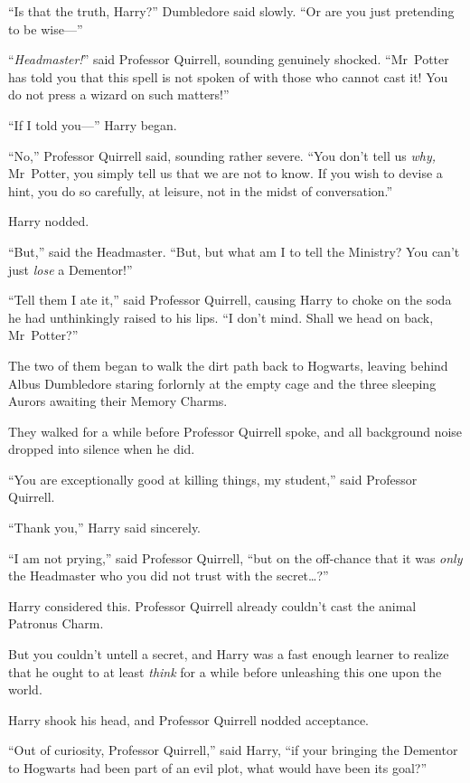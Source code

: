 “Is that the truth, Harry?” Dumbledore said slowly. “Or are you just pretending to be wise—”

“\emph{Headmaster!}” said Professor Quirrell, sounding genuinely shocked. “Mr~Potter has told you that this spell is not spoken of with those who cannot cast it! You do not press a wizard on such matters!”

“If I told you—” Harry began.

“No,” Professor Quirrell said, sounding rather severe. “You don’t tell us \emph{why,} Mr~Potter, you simply tell us that we are not to know. If you wish to devise a hint, you do so carefully, at leisure, not in the midst of conversation.”

Harry nodded.

“But,” said the Headmaster. “But, but what am I to tell the Ministry? You can’t just \emph{lose} a Dementor!”

“Tell them I ate it,” said Professor Quirrell, causing Harry to choke on the soda he had unthinkingly raised to his lips. “I don’t mind. Shall we head on back, Mr~Potter?”

The two of them began to walk the dirt path back to Hogwarts, leaving behind Albus Dumbledore staring forlornly at the empty cage and the three sleeping Aurors awaiting their Memory Charms.


They walked for a while before Professor Quirrell spoke, and all background noise dropped into silence when he did.

“You are exceptionally good at killing things, my student,” said Professor Quirrell.

“Thank you,” Harry said sincerely.

“I am not prying,” said Professor Quirrell, “but on the off-chance that it was \emph{only} the Headmaster who you did not trust with the secret…?”

Harry considered this. Professor Quirrell already couldn’t cast the animal Patronus Charm.

But you couldn’t untell a secret, and Harry was a fast enough learner to realize that he ought to at least \emph{think} for a while before unleashing this one upon the world.

Harry shook his head, and Professor Quirrell nodded acceptance.

“Out of curiosity, Professor Quirrell,” said Harry, “if your bringing the Dementor to Hogwarts had been part of an evil plot, what would have been its goal?”


